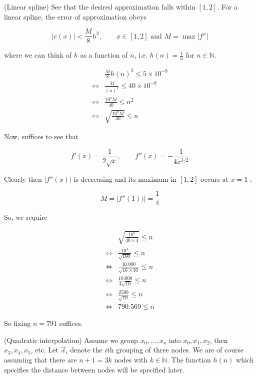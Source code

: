 \documentclass[12pt]{article}
\theoremstyle{definition}
\begin{document}
(Linear spline) See that the desired approximation falls within $[1, 2]$. For a
linear spline, the error of approximation obeys 

\begin{equation*}
    \left| e(x) \right| < \frac{M}{8}h^2, \qquad x \in [1, 2] \text{ and } M =
    \max |f''|
\end{equation*}

where we can think of $h$ as a function of $n$, i.e. $h(n) = \frac{1}{n}$ for
$n \in \mathbb{N}$. 

\begin{align*}
    &\frac{M}{8}h(n)^2 \leq 5 \times 10^{-8} \\ 
    \iff&\frac{M}{( n )^2} \leq 40 \times 10^{-8} \\ 
    \iff& \frac{10^8M}{40} \leq n^2 \\ 
    \iff&\sqrt{\frac{10^8 M}{40}} \leq n 
\end{align*}

Now, suffices to see that 

\begin{equation*}
    f'(x) = \frac{1}{2\sqrt{x} }, \qquad f''(x) = -\frac{1}{4 x^{3 / 2}}
\end{equation*}

Clearly then $|f''(x)|$ is decreasing and its maximum in $[1, 2]$ occurs at $x =
1$ :

\begin{equation*}
M = |f''(1))| = \frac{1}{4}
\end{equation*}

So, we require 

\begin{align*}
    &\sqrt{\frac{10^8}{40 \times 4}}   \leq n \\ 
    \iff& \frac{10^4}{\sqrt{160} }  \leq n \\ 
    \iff& \frac{10.000}{\sqrt{16 \times 10} }  \leq n \\
    \iff& \frac{10.000}{4\sqrt{10} }  \leq n \\
    \iff& \frac{2500}{\sqrt{10} }  \leq n \\
    \iff&790.569 \leq n
\end{align*}

So fixing $n = 791$ suffices.

(Quadratic interpolation) Assume we group $x_0, \ldots, x_n$ into $x_0,x_1,x_2$,
then $x_3,x_4,x_5$, etc. Let $\overrightarrow{x}_i$ denote the $i$th grouping of
three nodes. We are of course assuming that there are $n+1 = 3k$ nodes with $k
\in \mathbb{N}$. The function $h(n)$ which specifies the distance between nodes
will be specified later.
\end{document}
